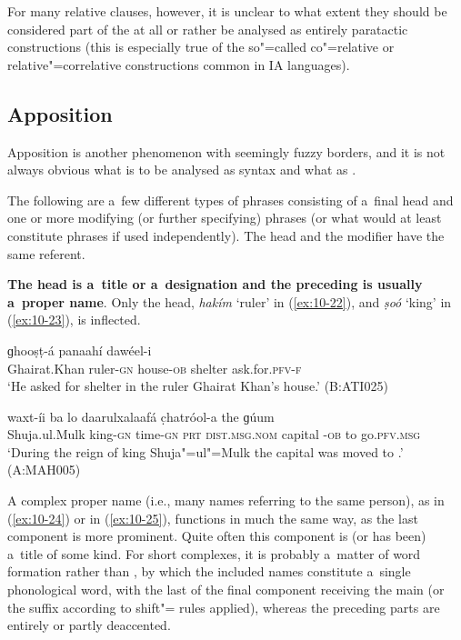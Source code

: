 For many relative clauses, however, it is unclear to what extent they should be considered part of the   at all or rather be analysed as entirely paratactic constructions (this is especially true of the so"=called co"=relative or relative"=correlative constructions common in IA languages). 


\subsection{Apposition}
\label{subsec:10-1-3}

Apposition is another phenomenon with seemingly fuzzy borders, and it is not always obvious what is to be analysed as   syntax and what as  .


The following are a~few different types of  phrases consisting of a~final  head and one or more modifying (or further specifying)  phrases (or what would at least constitute  phrases if used independently). The head and the modifier have the same referent.


\textbf{The head is a~title or a~designation and the preceding  is usually a~proper name}. Only the head, \textit{hakím} `ruler' in (\ref{ex:10-22}), and \textit{ṣoó} `king' in (\ref{ex:10-23}), is inflected.

\begin{exe}
\ex
\label{ex:10-22}
\gll [ɣeyrat"=xaán hakim-í] ɡhooṣṭ-á panaahí dawéel-i \\
Ghairat.Khan ruler-\textsc{gn} house-\textsc{ob} shelter ask.for.\textsc{pfv-f} \\
\glt `He asked for shelter in the ruler Ghairat Khan's house.' (B:ATI025)

\ex
\label{ex:10-23}
 waxt-íi ba lo daarulxalaafá c̣hatróol-a the ɡúum \\
Shuja.ul.Mulk king-\textsc{gn} time-\textsc{gn} \textsc{prt} \textsc{dist.msg.nom}  capital -\textsc{ob} to go.\textsc{pfv.msg}  \\
\glt `During the reign of king Shuja"=ul"=Mulk the capital was moved to .' (A:MAH005)
\end{exe}

A complex proper name (i.e., many names referring to the same person), as in (\ref{ex:10-24}) or in (\ref{ex:10-25}), functions in much the same way, as the last component is more prominent. Quite often this component is (or has been) a~title of some kind. For short complexes, it is probably a~matter of word formation rather than , by which the included names constitute a~single phonological word, with the last  of the final component receiving the main  (or the suffix according to shift"= rules applied), whereas the preceding parts are entirely or partly deaccented.

